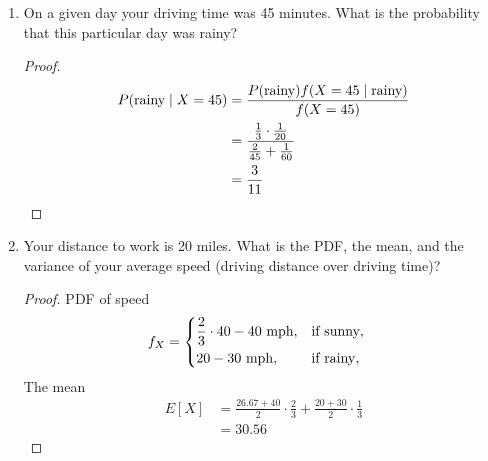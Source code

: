 \documentclass[paper=usletter, fontsize=12pt]{article}
\begin{document}
\begin{enumerate}
\begin{enumerate}
\begin{proof}
                Variance of uniform distribution
                \begin{align*}
                    E[X^2] & = \frac{2}{45}\int_{30}^{45}x^2\diff{x} + \frac{1}{60}\int_{40}^{60}x^2\diff{x}\\
                    & = \frac{16150}{9}\\
                    var(X) & = E[X^2] - (E[X])^2\\
                    & = \frac{175}{3}  \qedhere
                \end{align*}
                \endgroup

            \end{proof}

            \item On a given day your driving time was 45 minutes. What is the
            probability that this particular day was rainy?
            \begin{proof}

                \begin{align*}
                    P(\text{rainy} \mid X=45) & = \frac{P(\text{rainy})f(X=45 \mid \text{rainy})}{f(X=45)}\\
                    & = \frac{\frac{1}{3}\cdot\frac{1}{20}}{\frac{2}{45}+\frac{1}{60}} \\
                    & = \frac{3}{11} \qedhere
                \end{align*}

            \end{proof}

            \item Your distance to work is 20 miles. What is the PDF, the mean,
            and the variance of your average speed (driving distance over
            driving time)?
            \begin{proof}

                PDF of speed
                \begin{align*}
                    f_X & = \begin{dcases}
                        \frac{2}{3}\cdot40 - 40 \text{ mph}, & \text{if sunny},\\
                        20 - 30 \text{ mph}, & \text{if rainy},\\
                    \end{dcases}
                \end{align*}
                The mean
                \begin{align*}
                    E[X] & = \frac{26.67+40}{2} \cdot \frac{2}{3} + \frac{20+30}{2} \cdot \frac{1}{3}\\
                    & = 30.56
                \end{align*}
                \endgroup


\end{proof}
\end{enumerate}
\end{enumerate}
\end{document}
